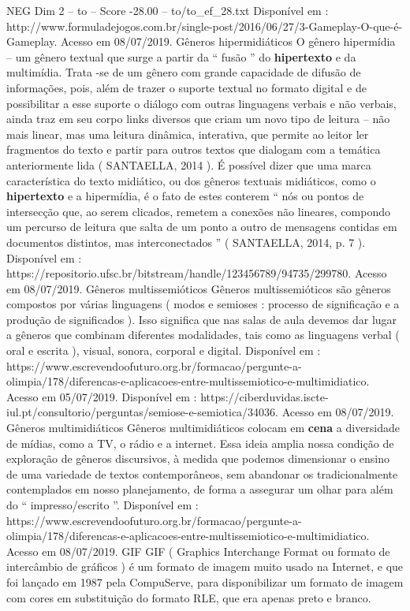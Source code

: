 \begin{textsample}{NEG Dim 2 – to – Score -28.00 – to/to\_ef\_28.txt}
Disponível em : http://www.formuladejogos.com.br/single-post/2016/06/27/3-Gameplay-O-que-é-Gameplay.
Acesso em 08/07/2019.
Gêneros hipermidiáticos O gênero hipermídia – um gênero textual que surge a partir da “ fusão ” do \textbf{hipertexto} e da multimídia.
Trata -se de um gênero com grande capacidade de difusão de informações, pois, além de trazer o suporte textual no formato digital e de possibilitar a esse suporte o diálogo com outras linguagens verbais e não verbais, ainda traz em seu corpo links diversos que criam um novo tipo de leitura – não mais linear, mas uma leitura dinâmica, interativa, que permite ao leitor ler fragmentos do texto e partir para outros textos que dialogam com a temática anteriormente lida ( SANTAELLA, 2014 ).
É possível dizer que uma marca característica do texto midiático, ou dos gêneros textuais midiáticos, como o \textbf{hipertexto} e a hipermídia, é o fato de estes conterem “ nós ou pontos de intersecção que, ao serem clicados, remetem a conexões não lineares, compondo um percurso de leitura que salta de um ponto a outro de mensagens contidas em documentos distintos, mas interconectados ” ( SANTAELLA, 2014, p. 7 ).
Disponível em : https://repositorio.ufsc.br/bitstream/handle/123456789/94735/299780.
Acesso em 08/07/2019.
Gêneros multissemióticos Gêneros multissemióticos são gêneros compostos por várias linguagens ( modos e semioses : processo de significação e a produção de significados ).
Isso significa que nas salas de aula devemos dar lugar a gêneros que combinam diferentes modalidades, tais como as linguagens verbal ( oral e escrita ), visual, sonora, corporal e digital.
Disponível em : https://www.escrevendoofuturo.org.br/formacao/pergunte-a-olimpia/178/diferencas-e-aplicacoes-entre-multissemiotico-e-multimidiatico.
Acesso em 05/07/2019.
Disponível em : https://ciberduvidas.iscte-iul.pt/consultorio/perguntas/semiose-e-semiotica/34036.
Acesso em 08/07/2019.
Gêneros multimidiáticos Gêneros multimidiáticos colocam em \textbf{cena} a diversidade de mídias, como a TV, o rádio e a internet.
Essa ideia amplia nossa condição de exploração de gêneros discursivos, à medida que podemos dimensionar o ensino de uma variedade de textos contemporâneos, sem abandonar os tradicionalmente contemplados em nosso planejamento, de forma a assegurar um olhar para além do “ impresso/escrito ”.
Disponível em : https://www.escrevendoofuturo.org.br/formacao/pergunte-a-olimpia/178/diferencas-e-aplicacoes-entre-multissemiotico-e-multimidiatico.
Acesso em 08/07/2019.
GIF GIF ( Graphics Interchange Format ou formato de intercâmbio de gráficos ) é um formato de imagem muito usado na Internet, e que foi lançado em 1987 pela CompuServe, para disponibilizar um formato de imagem com cores em substituição do formato RLE, que era apenas preto e branco.

\end{textsample}

